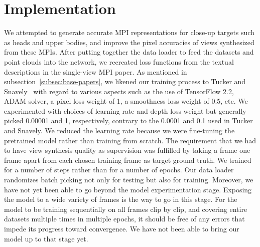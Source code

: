 \section{Implementation}\label{sec:implementation} 

We attempted to generate accurate MPI representations for close-up targets such as heads and upper bodies, and improve the pixel accuracies of views synthesized from these MPIs. After putting together the data loader to feed the datasets and point clouds into the network, we recreated loss functions from the textual descriptions in the single-view MPI paper. As mentioned in subsection~\ref{subsec:base-papers}, we likened our training process to Tucker and Snavely~\cite{single_view_mpi} with regard to various aspects such as the use of TensorFlow 2.2, ADAM solver, a pixel loss weight of 1, a smoothness loss weight of 0.5, etc. We experimented with choices of learning rate and depth loss weight but generally picked 0.00001 and 1, respectively, contrary to the 0.0001 and 0.1 used in Tucker and Snavely. We reduced the learning rate because we were fine-tuning the pretrained model rather than training from scratch. The requirement that we had to have view synthesis quality as supervision was fulfilled by taking a frame one frame apart from each chosen training frame as target ground truth. We trained for a number of steps rather than for a number of epochs. Our data loader randomizes batch picking not only for testing but also for training. Moreover, we have not yet been able to go beyond the model experimentation stage. Exposing the model to a wide variety of frames is the way to go in this stage. For the model to be training sequentially on all frames clip by clip, and covering entire datasets multiple times in multiple epochs, it should be free of any errors that impede its progress toward convergence. We have not been able to bring our model up to that stage yet. 


